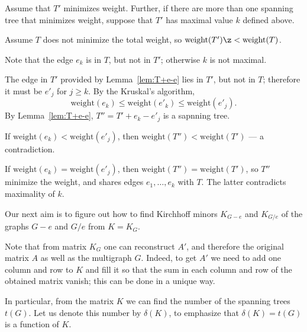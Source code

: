 Assume that $T'$ minimizes weight.
Further, if there are more than one spanning tree that minimizes weight, suppose that $T'$ has maximal value $k$ defined above.

Assume $T$ does not minimize the total weight, so $\mathrm{weight}(T')\z< \mathrm{weight}(T)$.

Note that the edge $e_k$ is in $T$, but not in $T'$; otherwise $k$ is not maximal.

The edge in $T'$ provided by Lemma~\ref{lem:T+e-e} lies in $T'$, but not in $T$;
therefore it must be $e'_j$ for $j\ge k$.
By the Kruskal’s algorithm,
\[\mathrm{weight}(e_k)\le \mathrm{weight}(e'_k)\le \mathrm{weight}(e'_j).\]
By Lemma~\ref{lem:T+e-e}, $T''=T'+e_k-e'_j$ is a sapnning tree.

If $\mathrm{weight}(e_k)< \mathrm{weight}(e'_j)$, then $\mathrm{weight}(T'')<\mathrm{weight}(T')$ --- a contradiction.

If $\mathrm{weight}(e_k)=\mathrm{weight}(e'_j)$, then $\mathrm{weight}(T'')=\mathrm{weight}(T')$, so $T''$ minimize the weight, and shares edges $e_1,\dots,e_k$ with $T$.
The latter contradicts maximality of $k$.
\qeds































Our next aim is to figure out how to find Kirchhoff minors $K_{G- e}$ and $K_{G/e}$ of the graphs $G- e$ and $G/e$ from $K=K_G$.



Note that from matrix $K_G$ one can reconstruct $A'$, and therefore the original matrix $A$ as well as the multigraph $G$.
Indeed, to get $A'$ we need to add one column and row to $K$ and fill it so that the sum in each column and row of the obtained matrix vanish;
this can be done in a unique way.

In particular, from the matrix $K$ we can find the number of the spanning trees $t(G)$.
Let us denote this number by $\delta(K)$, to emphasize that $\delta(K)=t(G)$ is a function of $K$.

